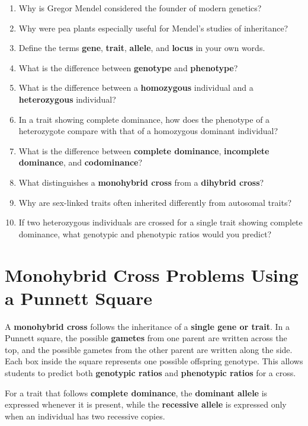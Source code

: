 \documentclass[
  letterpaper,
  DIV=11,
  numbers=noendperiod]{scrreprt}
\begin{document}
\begin{enumerate}
\def\labelenumi{\arabic{enumi}.}
\item
  Why is Gregor Mendel considered the founder of modern genetics?
\item
  Why were pea plants especially useful for Mendel's studies of
  inheritance?
\item
  Define the terms \textbf{gene}, \textbf{trait}, \textbf{allele}, and
  \textbf{locus} in your own words.
\item
  What is the difference between \textbf{genotype} and
  \textbf{phenotype}?
\item
  What is the difference between a \textbf{homozygous} individual and a
  \textbf{heterozygous} individual?
\item
  In a trait showing complete dominance, how does the phenotype of a
  heterozygote compare with that of a homozygous dominant individual?
\item
  What is the difference between \textbf{complete dominance},
  \textbf{incomplete dominance}, and \textbf{codominance}?
\item
  What distinguishes a \textbf{monohybrid cross} from a \textbf{dihybrid
  cross}?
\item
  Why are sex-linked traits often inherited differently from autosomal
  traits?
\item
  If two heterozygous individuals are crossed for a single trait showing
  complete dominance, what genotypic and phenotypic ratios would you
  predict?
\end{enumerate}

\section{\texorpdfstring{\textbf{Monohybrid Cross Problems Using a
Punnett
Square}}{Monohybrid Cross Problems Using a Punnett Square}}\label{monohybrid-cross-problems-using-a-punnett-square}

A \textbf{monohybrid cross} follows the inheritance of a \textbf{single
gene or trait}. In a Punnett square, the possible \textbf{gametes} from
one parent are written across the top, and the possible gametes from the
other parent are written along the side. Each box inside the square
represents one possible offspring genotype. This allows students to
predict both \textbf{genotypic ratios} and \textbf{phenotypic ratios}
for a cross.

For a trait that follows \textbf{complete dominance}, the
\textbf{dominant allele} is expressed whenever it is present, while the
\textbf{recessive allele} is expressed only when an individual has two
recessive copies.
\end{document}
